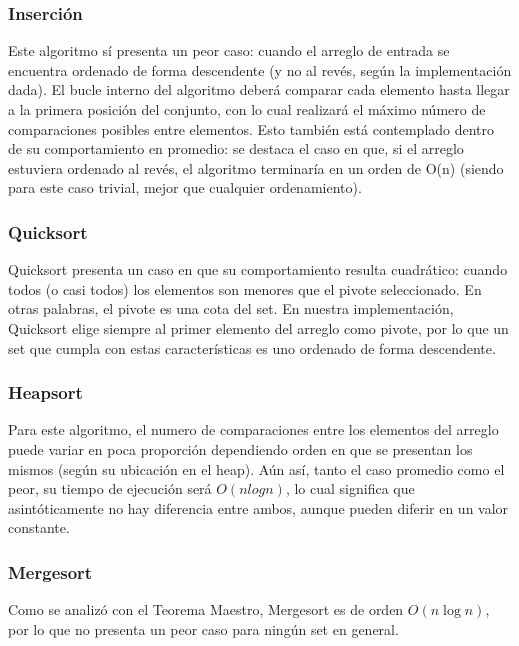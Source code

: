 \documentclass[article,a4paper]{article}
\begin{document}
\subsubsection{Inserción}

Este algoritmo sí presenta un peor caso: cuando el arreglo de entrada se encuentra ordenado de forma descendente (y no al revés, según la implementación dada). El bucle interno del algoritmo deberá comparar cada elemento hasta llegar a la primera posición del conjunto, con lo cual realizará el máximo número de comparaciones posibles entre elementos. Esto también está contemplado dentro de su comportamiento en promedio: se destaca el caso en que, si el arreglo estuviera ordenado al revés, el algoritmo terminaría en un orden de O(n) (siendo para este caso trivial, mejor que cualquier ordenamiento).

\subsubsection{Quicksort}

Quicksort presenta un caso en que su comportamiento resulta cuadrático: cuando todos (o casi todos) los elementos son  menores que el pivote seleccionado. En otras palabras, el pivote es una cota del set. En nuestra implementación, Quicksort elige siempre al primer elemento del arreglo como pivote, por lo que un set que cumpla con estas características es uno ordenado de forma  descendente.

\subsubsection{Heapsort}

Para este algoritmo, el numero de comparaciones entre los elementos del arreglo puede variar en poca proporción dependiendo orden en que se presentan los mismos (según su ubicación en el heap). Aún así, tanto el caso promedio como el peor, su tiempo de ejecución será $O(n log n)$, lo cual significa que asintóticamente no hay diferencia entre ambos, aunque pueden diferir en un valor constante.

\subsubsection{Mergesort}

Como se analizó con el Teorema Maestro, Mergesort es de orden $O(n \log n)$, por lo que no presenta un peor caso para ningún set en general.
\end{document}
